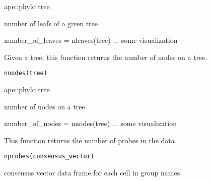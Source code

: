 \documentclass[a4paper]{book}
\begin{document}
%
\begin{Arguments}
\begin{ldescription}
\item[\code{tree}] ape::phylo tree
\end{ldescription}
\end{Arguments}
%
\begin{Value}
number of leafs of a given tree
\end{Value}
%
\begin{Examples}
\begin{ExampleCode}
number_of_leaves = nleaves(tree)
... some visualization 
\end{ExampleCode}
\end{Examples}
%
\begin{Description}\relax
Given a tree, this function returns the number of nodes on a tree.
\end{Description}
%
\begin{Usage}
\begin{verbatim}
nnodes(tree)
\end{verbatim}
\end{Usage}
%
\begin{Arguments}
\begin{ldescription}
\item[\code{tree}] ape::phylo tree
\end{ldescription}
\end{Arguments}
%
\begin{Value}
number of nodes on a tree
\end{Value}
%
\begin{Examples}
\begin{ExampleCode}
number_of_nodes = nnodes(tree)
... some visualization 
\end{ExampleCode}
\end{Examples}
%
\begin{Description}\relax
This function returns the number of probes in the data
\end{Description}
%
\begin{Usage}
\begin{verbatim}
nprobes(consensus_vector)
\end{verbatim}
\end{Usage}
%
\begin{Arguments}
\begin{ldescription}
\item[\code{consensus\_vector}] consensus vector data frame for each cell in group 
names
\end{ldescription}
\end{Arguments}
\end{document}
